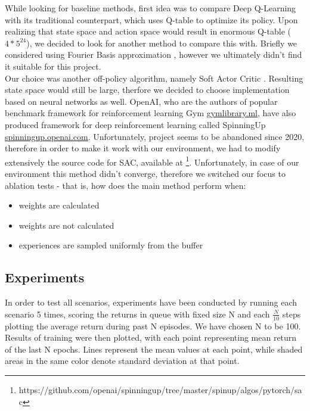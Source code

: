 \documentclass[a4paper,11pt]{article}
\theoremstyle{definition}
\begin{document}
While looking for baseline methods, first idea was to compare Deep Q-Learning with its traditional counterpart, which uses Q-table to optimize its policy. Upon realizing that state space and action space would result in enormous Q-table ($4*5^{24}$), we decided to look for another method to compare this with. Briefly we considered using Fourier Basis approximation \cite{ziemke_2020}, however we ultimately didn't find it suitable for this project.\\
Our choice was another off-policy algorithm, namely Soft Actor Critic \cite{haarnoja_2018}. Resulting state space would still be large, therfore we decided to choose implementation based on neural networks as well. OpenAI, who are the authors of popular benchmark framework for reinforcement learning Gym \url{gymlibrary.ml}, have also produced framework for deep reinforcement learning called SpinningUp \url{spinningup.openai.com}. Unfortunately, project seems to be abandoned since 2020, therefore in order to make it work with our environment, we had to modify extensively the source code for SAC, available at \footnote{https://github.com/openai/spinningup/tree/master/spinup/algos/pytorch/sac}. 
Unfortunately, in case of our environment this method didn't converge, therefore we switched our focus to ablation tests - that is, how does the main method perform when:

\begin{itemize}
    \item weights are calculated
    \item weights are not calculated
    \item experiences are sampled uniformly from the buffer
\end{itemize}

\subsection{Experiments}
In order to test all scenarios, experiments have been conducted by running each scenario 5 times, scoring the returns in queue with fixed size N and each $\frac{N}{10}$ steps plotting the average return during past N episodes. We have chosen N to be 100.\\
Results of training were then plotted, with each point representing mean return of the last N epochs. Lines represent the mean values at each point, while shaded areas in the same color denote standard deviation at that point.\\
\end{document}
